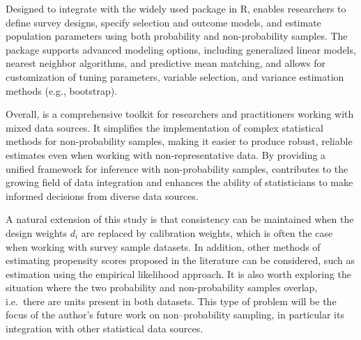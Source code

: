\documentclass[
]{jss}
\begin{document}
Designed to integrate with the widely used  package in R,
 enables researchers to define survey designs, specify
selection and outcome models, and estimate population parameters using
both probability and non-probability samples. The package supports
advanced modeling options, including generalized linear models, nearest
neighbor algorithms, and predictive mean matching, and allows for
customization of tuning parameters, variable selection, and variance
estimation methods (e.g., bootstrap).

Overall,  is a comprehensive toolkit for researchers and
practitioners working with mixed data sources. It simplifies the
implementation of complex statistical methods for non-probability
samples, making it easier to produce robust, reliable estimates even
when working with non-representative data. By providing a unified
framework for inference with non-probability samples, 
contributes to the growing field of data integration and enhances the
ability of statisticians to make informed decisions from diverse data
sources.

A natural extension of this study is that consistency can be maintained
when the design weights \(d_i\) are replaced by calibration weights,
which is often the case when working with survey sample datasets. In
addition, other methods of estimating propensity scores proposed in the
literature can be considered, such as estimation using the empirical
likelihood approach. It is also worth exploring the situation where the
two probability and non-probability samples overlap, i.e.~there are
units present in both datasets. This type of problem will be the focus
of the author's future work on non--probability sampling, in particular
its integration with other statistical data sources.


\end{document}

